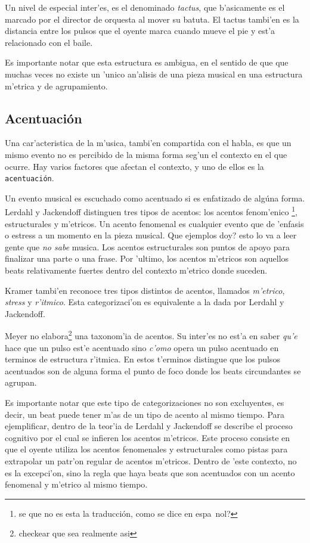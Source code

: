 Un nivel de especial inter'es, es el denominado \emph{tactus}, que b'asicamente es el marcado por el director de orquesta al mover su batuta. 
El tactus tambi'en es la distancia entre los pulsos que el oyente marca cuando mueve el pie y est'a relacionado con el baile. 

Es importante notar que esta estructura es ambigua, en el sentido de que que muchas veces no existe un 'unico an'alisis de una pieza musical 
en una estructura m'etrica y de agrupamiento.


\subsection{Acentuaci\'on}
Una car'acteristica de la m'usica, tambi'en compartida con el habla, es que un mismo evento no es percibido de la misma forma seg'un
el contexto en el que ocurre. Hay varios factores que afectan el contexto, y uno de ellos es la \texttt{acentuaci\'on}. 

Un evento musical es escuchado como acentuado si es enfatizado de alg\'una forma. Lerdahl y Jackendoff\cite{LerdahlJackendoff83} distinguen tres tipos de 
acentos: los acentos fenom'enico \footnote{\alert{se que no es esta la traducci\'on, como se dice en espa~nol?}}, estructurales y m'etricos.
Un acento fenomenal es cualquier evento que de 'enfasis o estress a un momento en la pieza musical. \alert{Que ejemplos doy? esto lo va a 
leer gente que \emph{no sabe} musica}. Los acentos estructurales son puntos de apoyo para finalizar una parte o una frase. 
Por 'ultimo, los acentos m'etricos son aquellos beats relativamente fuertes dentro del contexto m'etrico donde suceden.

Kramer\cite{Kramer88} tambi'en reconoce tres tipos distintos de acentos, llamados \emph{m'etrico}, \emph{stress} y \emph{r'itmico}. Esta categorizaci'on
es equivalente a la dada por Lerdahl y Jackendoff.

Meyer\cite{CooperMeyer60} no elabora\footnote{checkear que sea realmente asi} una taxonom'ia de acentos. Su inter'es no est'a en saber \emph{qu'e} hace
que un pulso est'e acentuado sino \emph{c'omo} opera un pulso acentuado en terminos de estructura r'itmica. En estos t'erminos distingue
que los pulsos acentuados son de alguna forma el punto de foco donde los beats circundantes se agrupan. 

Es importante notar que este tipo de categorizaciones no son excluyentes, es decir, un beat puede tener m'as de un tipo de acento al mismo tiempo.
Para ejemplificar, dentro de la teor'ia de Lerdahl y Jackendoff se describe el proceso cognitivo por el cual se infieren los acentos m'etricos. Este
proceso consiste en que el oyente utiliza los acentos fenomenales y estructurales como pistas para extrapolar un patr'on regular de acentos m'etricos. 
Dentro de 'este contexto, no es la excepci'on, sino la regla que haya beats que son acentuados con un acento fenomenal y m'etrico al mismo tiempo.



